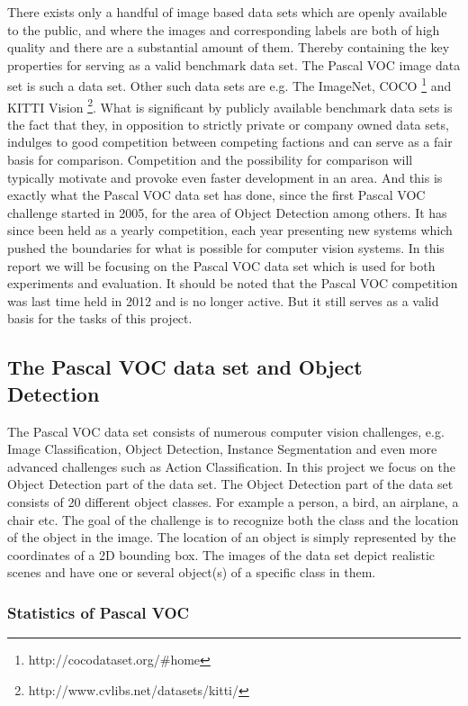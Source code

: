 \documentclass{article}
\begin{document}
There exists only a handful of image based data sets which are openly available to the public, and where the images and corresponding labels are both of high quality and there are a substantial amount of them. Thereby containing the key properties for serving as a valid benchmark data set. The Pascal VOC image data set is such a data set. Other such data sets are e.g. The ImageNet, COCO \footnote{http://cocodataset.org/\#home} and KITTI Vision \footnote{http://www.cvlibs.net/datasets/kitti/}. What is significant by publicly available benchmark data sets is the fact that they, in opposition to strictly private or company owned data sets, indulges to good competition between competing factions and can serve as a fair basis for comparison. Competition and the possibility for comparison will typically motivate and provoke even faster development in an area. And this is exactly what the Pascal VOC data set has done, since the first Pascal VOC challenge started in 2005, for the area of Object Detection among others. It has since been held as a yearly competition, each year presenting new systems which pushed the boundaries for what is possible for computer vision systems. In this report we will be focusing on the Pascal VOC data set which is used for both experiments and evaluation. It should be noted that the Pascal VOC competition was last time held in 2012 and is no longer active. But it still serves as a valid basis for the tasks of this project.  

\subsection{The Pascal VOC data set and Object Detection}
The Pascal VOC data set consists of numerous computer vision challenges, e.g. Image Classification, Object Detection, Instance Segmentation and even more advanced challenges such as Action Classification.   In this project we focus on the Object Detection part of the data set. The Object Detection part of the data set consists of 20 different object classes. For example a person, a bird, an airplane, a chair etc. The goal of the challenge is to recognize both the class and the location of the object in the image. The location of an object is simply represented by the coordinates of a 2D bounding box. The images of the data set depict realistic scenes and have one or several object(s) of a specific class in them.

\subsubsection{Statistics of Pascal VOC}
 
\end{document}
